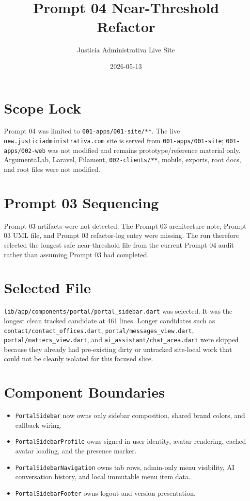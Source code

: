 \documentclass[11pt]{article}
\title{Prompt 04 Near-Threshold Refactor}
\author{Justicia Administrativa Live Site}
\date{2026-05-13}
\begin{document}
\maketitle

\section*{Scope Lock}
Prompt 04 was limited to \texttt{001-apps/001-site/**}. The live
\texttt{new.justiciadministrativa.com} site is served from
\texttt{001-apps/001-site}; \texttt{001-apps/002-web} was not modified and
remains prototype/reference material only. ArgumentaLab, Laravel, Filament,
\texttt{002-clients/**}, mobile, exports, root docs, and root files were not
modified.

\section*{Prompt 03 Sequencing}
Prompt 03 artifacts were not detected. The Prompt 03 architecture note,
Prompt 03 UML file, and Prompt 03 refactor-log entry were missing. The run
therefore selected the longest safe near-threshold file from the current
Prompt 04 audit rather than assuming Prompt 03 had completed.

\section*{Selected File}
\texttt{lib/app/components/portal/portal\_sidebar.dart} was selected. It was
the longest clean tracked candidate at 461 lines. Longer candidates such as
\texttt{contact/contact\_offices.dart}, \texttt{portal/messages\_view.dart},
\texttt{portal/matters\_view.dart}, and \texttt{ai\_assistant/chat\_area.dart}
were skipped because they already had pre-existing dirty or untracked
site-local work that could not be cleanly isolated for this focused slice.

\section*{Component Boundaries}
\begin{itemize}
  \item \texttt{PortalSidebar} now owns only sidebar composition, shared brand
  colors, and callback wiring.
  \item \texttt{PortalSidebarProfile} owns signed-in user identity, avatar
  rendering, cached avatar loading, and the presence marker.
  \item \texttt{PortalSidebarNavigation} owns tab rows, admin-only menu
  visibility, AI conversation history, and local immutable menu item data.
  \item \texttt{PortalSidebarFooter} owns logout and version presentation.
\end{itemize}
\end{document}
